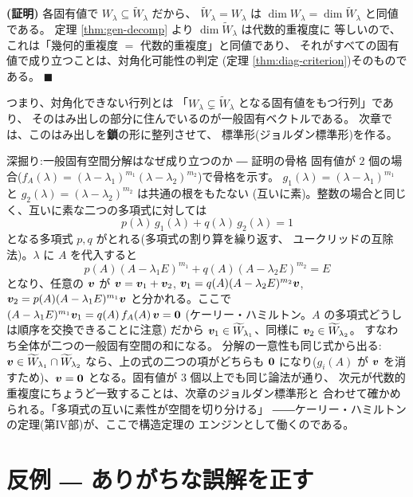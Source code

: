 \noindent\textbf{(証明)}\quad
各固有値で $W_\lambda \subseteq \widetilde{W}_\lambda$ だから、
$\widetilde{W}_\lambda = W_\lambda$ は
$\dim W_\lambda = \dim \widetilde{W}_\lambda$ と同値である。
定理 \ref{thm:gen-decomp} より $\dim \widetilde{W}_\lambda$ は代数的重複度に
等しいので、これは「幾何的重複度 $=$ 代数的重複度」と同値であり、
それがすべての固有値で成り立つことは、対角化可能性の判定
(定理 \ref{thm:diag-criterion})そのものである。 $\blacksquare$

つまり、対角化できない行列とは
「$W_\lambda \subsetneq \widetilde{W}_\lambda$ となる固有値をもつ行列」であり、
そのはみ出しの部分に住んでいるのが一般固有ベクトルである。
次章では、このはみ出しを\textbf{鎖}の形に整列させて、
標準形(ジョルダン標準形)を作る。

\begin{itembox}[l]{深掘り:一般固有空間分解はなぜ成り立つのか ― 証明の骨格}
固有値が $2$ 個の場合($f_A(\lambda) = (\lambda - \lambda_1)^{m_1}
(\lambda - \lambda_2)^{m_2}$)で骨格を示す。
$g_1(\lambda) = (\lambda - \lambda_1)^{m_1}$ と
$g_2(\lambda) = (\lambda - \lambda_2)^{m_2}$ は共通の根をもたない
(互いに素)。整数の場合と同じく、互いに素な二つの多項式に対しては
\[
p(\lambda)\,g_1(\lambda) + q(\lambda)\,g_2(\lambda) = 1
\]
となる多項式 $p, q$ がとれる(多項式の割り算を繰り返す、
ユークリッドの互除法)。$\lambda$ に $A$ を代入すると
\[
p(A)(A - \lambda_1 E)^{m_1} + q(A)(A - \lambda_2 E)^{m_2} = E
\]
となり、任意の $\bm{v}$ が
$\bm{v} = \bm{v}_1 + \bm{v}_2$,
$\bm{v}_1 = q(A)(A - \lambda_2 E)^{m_2}\bm{v}$,
$\bm{v}_2 = p(A)(A - \lambda_1 E)^{m_1}\bm{v}$ と分かれる。ここで
$(A - \lambda_1 E)^{m_1}\bm{v}_1 = q(A)\,f_A(A)\,\bm{v} = \bm{0}$
(ケーリー・ハミルトン。$A$ の多項式どうしは順序を交換できることに注意)
だから $\bm{v}_1 \in \widetilde{W}_{\lambda_1}$、同様に
$\bm{v}_2 \in \widetilde{W}_{\lambda_2}$。
すなわち全体が二つの一般固有空間の和になる。
分解の一意性も同じ式から出る:$\bm{v} \in \widetilde{W}_{\lambda_1}
\cap \widetilde{W}_{\lambda_2}$ なら、上の式の二つの項がどちらも
$\bm{0}$ になり($g_i(A)$ が $\bm{v}$ を消すため)、$\bm{v} = \bm{0}$
となる。固有値が $3$ 個以上でも同じ論法が通り、
次元が代数的重複度にちょうど一致することは、次章のジョルダン標準形と
合わせて確かめられる。「多項式の互いに素性が空間を切り分ける」
――ケーリー・ハミルトンの定理(第IV部)が、ここで構造定理の
エンジンとして働くのである。
\end{itembox}

\section{反例 ― ありがちな誤解を正す}

